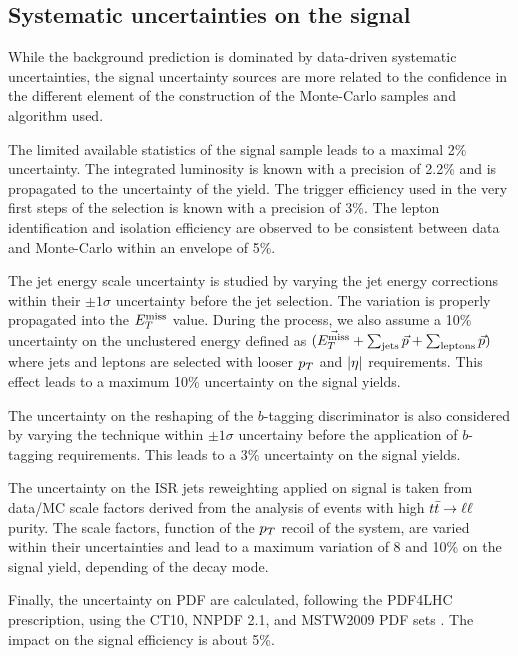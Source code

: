         \subsection{Systematic uncertainties on the signal}

        While the background prediction is dominated by data-driven systematic
        uncertainties, the signal uncertainty sources are more related to the
        confidence in the different element of the construction of the Monte-Carlo
        samples and algorithm used.

        The limited available statistics of the signal sample leads to a maximal
        2\% uncertainty. The integrated luminosity is known with a precision of 2.2\%
        and is propagated to the uncertainty of the yield. The trigger efficiency
        used in the very first steps of the selection is known with a precision of 3\%.
        The lepton identification and isolation efficiency are observed to be consistent
        between data and Monte-Carlo within an envelope of 5\%.

        The jet energy scale uncertainty is studied by varying the jet energy corrections
        within their $\pm1\sigma$ uncertainty before the jet selection. The variation is
        properly propagated into the $E_T^\text{miss}$ value. During the process, we also assume a
        10\% uncertainty on the unclustered energy defined as $(\vec{E_T^\text{miss}} + \sum_\text{jets}
        \vec{p} + \sum_\text{leptons} \vec{p})$ where jets and leptons are selected with looser
        $p_T$ and $\left| \eta \right|$ requirements. This effect leads to a maximum 10\% uncertainty on
        the signal yields.

        The uncertainty on the reshaping of the $b$-tagging discriminator is also considered
        by varying the technique within $\pm1\sigma$ uncertainy before the application of
        $b$-tagging requirements. This leads to a 3\% uncertainty on the signal yields.

        The uncertainty on the ISR jets reweighting applied on signal is taken from data/MC
        scale factors derived from the analysis of events with high $t\bar{t} \rightarrow \ell \ell$ purity. The
        scale factors, function of the $p_T$ recoil of the system, are varied within their
        uncertainties and lead to a maximum variation of 8 and 10\% on the signal yield, depending
        of the decay mode.

        Finally, the uncertainty on PDF are calculated, following the PDF4LHC prescription,
        using the CT10, NNPDF 2.1, and MSTW2009 PDF sets \cite{PDF4LHC}. The impact on the
        signal efficiency is about 5\%.

